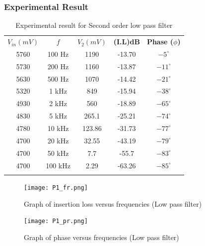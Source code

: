 \documentclass[a4paper, 12pt, english]{article}
\newcommand{\myrowcolour}{\rowcolor[gray]{0.925}}
\begin{document}
\subsubsection{Experimental Result}
\begin{table}[!ht]
	\caption{\label{tab:Table 1} Experimental result for Second order low pass filter}
	\centering
	\begin{tabular}{c c c c c}
		\toprule
		\textbf{$ V_{in} (mV)$}
		     & \textbf{$ f $}
		     & \textbf{$V_{2} (mV)$}
		     & \textbf{(I.L)dB}
		     & \textbf{Phase ($\phi $)}                                   \\
		\cmidrule[0.4pt](r{0.125em}){1-1}%
		\cmidrule[0.4pt](lr{0.125em}){2-2}%
		\cmidrule[0.4pt](lr{0.125em}){3-3}%
		\cmidrule[0.4pt](lr{0.125em}){4-4}%
		\cmidrule[0.4pt](lr{0.125em}){5-5}%
		5760 & 100 Hz                   & 1190   & -13.70 & $-5^{\circ}$  \\
		\myrowcolour%
		5730 & 200 Hz                   & 1160   & -13.87 & $-11^{\circ}$ \\
		5630 & 500 Hz                   & 1070   & -14.42 & $-21^{\circ}$ \\
		\myrowcolour%
		5320 & 1 kHz                    & 849    & -15.94 & $-38^{\circ}$ \\
		4930 & 2 kHz                    & 560    & -18.89 & $-65^{\circ}$ \\
		\myrowcolour%
		4830 & 5 kHz                    & 265.1  & -25.21 & $-74^{\circ}$ \\
		4780 & 10 kHz                   & 123.86 & -31.73 & $-77^{\circ}$ \\
		\myrowcolour%
		4700 & 20 kHz                   & 32.55  & -43.19 & $-79^{\circ}$ \\
		4700 & 50 kHz                   & 7.7    & -55.7  & $-83^{\circ}$ \\
		\myrowcolour%
		4700 & 100 kHz                  & 2.29   & -63.26 & $-85^{\circ}$ \\
		\bottomrule                                                       \\
	\end{tabular}
\end{table}
\begin{figure}[!ht]
	\begin{center}
		\texttt{[image: P1\_fr.png]}
		\caption{\label{fig:P1_fr}Graph of insertion loss versus frequencies (Low pass filter)}
	\end{center}
\end{figure}
\begin{figure}[!ht]
	\begin{center}
		\texttt{[image: P1\_pr.png]}
		\caption{\label{fig:P1_pr}Graph of phase versus frequencies (Low pass filter)}
	\end{center}
\end{figure}
\FloatBarrier
\end{document}
